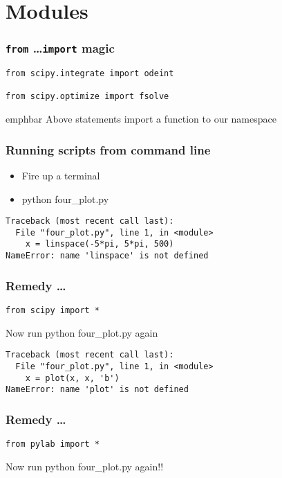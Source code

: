\documentclass[14pt,compress]{beamer}
\newcommand{\emphbar}[1]
{\begin{beamercolorbox}[rounded=true]{emphbar} 
      {#1}
 \end{beamercolorbox}
}
\begin{document}
\section{Modules}
\begin{frame}[fragile]
  \frametitle{\texttt{from} \ldots \texttt{import} magic}
  \begin{lstlisting}
from scipy.integrate import odeint

from scipy.optimize import fsolve
  \end{lstlisting}
\emphbar{Above statements import a function to our namespace}
\end{frame}

\begin{frame}[fragile]
  \frametitle{Running scripts from command line}
  \small
  \begin{itemize}
    \item Fire up a terminal
    \item python four\_plot.py
  \end{itemize}
  \pause
  \begin{lstlisting}
Traceback (most recent call last):
  File "four_plot.py", line 1, in <module>
    x = linspace(-5*pi, 5*pi, 500)
NameError: name 'linspace' is not defined
  \end{lstlisting}
\end{frame}

\begin{frame}[fragile]
  \frametitle{Remedy \ldots}
  \begin{lstlisting}
from scipy import *
  \end{lstlisting}
\alert{Now run python four\_plot.py again}
\end{frame}

\begin{frame}[fragile]
  \begin{lstlisting}
Traceback (most recent call last):
  File "four_plot.py", line 1, in <module>
    x = plot(x, x, 'b')
NameError: name 'plot' is not defined
  \end{lstlisting}
\end{frame}

\begin{frame}[fragile]
  \frametitle{Remedy \ldots}
  \begin{lstlisting}
from pylab import *
  \end{lstlisting}
\alert{Now run python four\_plot.py again!!}
\end{frame}
\end{document}

